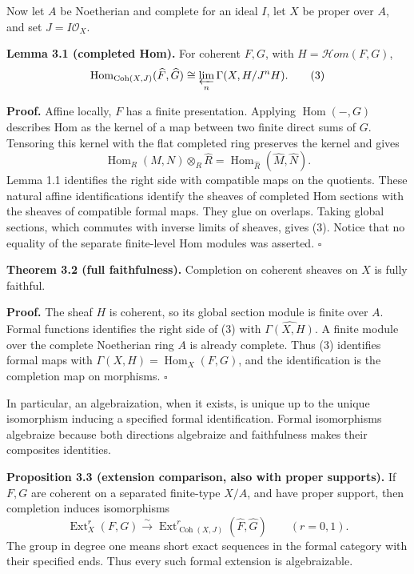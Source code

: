\documentclass[11pt]{article}
\begin{document}
Now let \(A\) be Noetherian and complete for an ideal \(I\), let \(X\)
be proper over \(A\), and set \(J=I\mathcal O_X\).

\textbf{Lemma 3.1 (completed Hom).} For coherent \(F,G\), with
\(H=\mathcal Hom(F,G)\), \[
\operatorname{Hom}_{\operatorname{Coh}(X,J)}(\widehat F,\widehat G)
\cong\varprojlim_n\Gamma(X,H/J^nH).
\tag{3}
\]

\textbf{Proof.} Affine locally, \(F\) has a finite presentation.
Applying \(\operatorname{Hom}(-,G)\) describes Hom as the kernel of a
map between two finite direct sums of \(G\). Tensoring this kernel with
the flat completed ring preserves the kernel and gives \[
\operatorname{Hom}_R(M,N)\otimes_R\widehat R
=\operatorname{Hom}_{\widehat R}(\widehat M,\widehat N).
\] Lemma 1.1 identifies the right side with compatible maps on the
quotients. These natural affine identifications identify the sheaves of
completed Hom sections with the sheaves of compatible formal maps. They
glue on overlaps. Taking global sections, which commutes with inverse
limits of sheaves, gives (3). Notice that no equality of the separate
finite-level Hom modules was asserted. \(\square\)

\textbf{Theorem 3.2 (full faithfulness).} Completion on coherent sheaves
on \(X\) is fully faithful.

\textbf{Proof.} The sheaf \(H\) is coherent, so its global section
module is finite over \(A\). Formal functions identifies the right side
of (3) with \(\widehat{\Gamma(X,H)}\). A finite module over the complete
Noetherian ring \(A\) is already complete. Thus (3) identifies formal
maps with \(\Gamma(X,H)=\operatorname{Hom}_X(F,G)\), and the
identification is the completion map on morphisms. \(\square\)

In particular, an algebraization, when it exists, is unique up to the
unique isomorphism inducing a specified formal identification. Formal
isomorphisms algebraize because both directions algebraize and
faithfulness makes their composites identities.

\textbf{Proposition 3.3 (extension comparison, also with proper
supports).} If \(F,G\) are coherent on a separated finite-type \(X/A\),
and have proper support, then completion induces isomorphisms \[
\operatorname{Ext}^r_X(F,G)
\xrightarrow{\sim}
\operatorname{Ext}^r_{\operatorname{Coh}(X,J)}(\widehat F,\widehat G)
\qquad(r=0,1).
\] The group in degree one means short exact sequences in the formal
category with their specified ends. Thus every such formal extension is
algebraizable.
\end{document}
